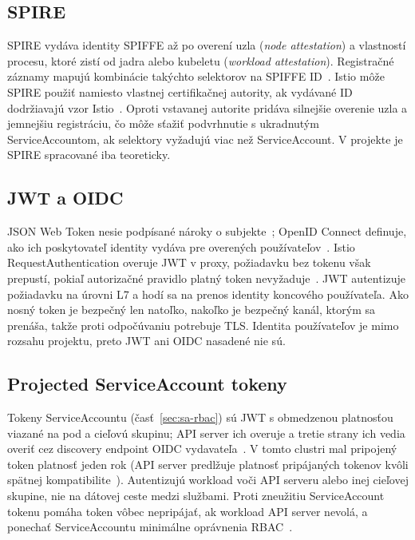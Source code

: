 \subsection{SPIRE}

SPIRE vydáva identity SPIFFE až po overení uzla (\emph{node attestation}) a vlastností procesu, ktoré zistí od jadra alebo kubeletu (\emph{workload attestation}). Registračné záznamy mapujú kombinácie takýchto selektorov na SPIFFE ID~\cite{spire-concepts}. Istio môže SPIRE použiť namiesto vlastnej certifikačnej autority, ak vydávané ID dodržiavajú vzor Istio~\cite{istio-spire}. Oproti vstavanej autorite pridáva silnejšie overenie uzla a jemnejšiu registráciu, čo môže sťažiť podvrhnutie s ukradnutým ServiceAccountom, ak selektory vyžadujú viac než ServiceAccount. V projekte je SPIRE spracované iba teoreticky.

\subsection{JWT a OIDC}

JSON Web Token nesie podpísané nároky o subjekte~\cite{rfc7519}; OpenID Connect definuje, ako ich poskytovateľ identity vydáva pre overených používateľov~\cite{oidc-core}. Istio RequestAuthentication overuje JWT v proxy, požiadavku bez tokenu však prepustí, pokiaľ autorizačné pravidlo platný token nevyžaduje~\cite{istio-requestauthentication}. JWT autentizuje požiadavku na úrovni L7 a hodí sa na prenos identity koncového používateľa. Ako nosný token je bezpečný len natoľko, nakoľko je bezpečný kanál, ktorým sa prenáša, takže proti odpočúvaniu potrebuje TLS. Identita používateľov je mimo rozsahu projektu, preto JWT ani OIDC nasadené nie sú.

\subsection{Projected ServiceAccount tokeny}

Tokeny ServiceAccountu (časť~\ref{sec:sa-rbac}) sú JWT s obmedzenou platnosťou viazané na pod a cieľovú skupinu; API server ich overuje a tretie strany ich vedia overiť cez discovery endpoint OIDC vydavateľa~\cite{k8s-authentication,k8s-serviceaccounts}. V tomto clustri mal pripojený token platnosť jeden rok (API server predlžuje platnosť pripájaných tokenov kvôli spätnej kompatibilite~\cite{k8s-sa-concepts}). Autentizujú workload voči API serveru alebo inej cieľovej skupine, nie na dátovej ceste medzi službami. Proti zneužitiu ServiceAccount tokenu pomáha token vôbec nepripájať, ak workload API server nevolá, a ponechať ServiceAccountu minimálne oprávnenia RBAC~\cite{k8s-serviceaccounts,k8s-rbac}.

